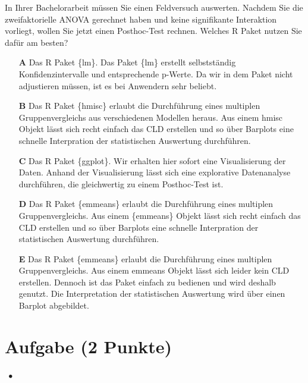 \documentclass[a4paper, 9pt]{scrartcl}\usepackage[]{graphicx}\usepackage[]{xcolor}
\begin{document}
In Ihrer Bachelorarbeit müssen Sie einen Feldversuch auswerten. Nachdem Sie die zweifaktorielle ANOVA gerechnet haben und keine signifikante Interaktion vorliegt, wollen Sie jetzt einen Posthoc-Test rechnen. Welches R Paket nutzen Sie dafür am besten?



\begin{enumerate}
\item [\textbf{A} \msquare] Das R Paket \{lm\}. Das Paket \{lm\} erstellt selbstständig Konfidenzintervalle und entsprechende p-Werte. Da wir in dem Paket nicht adjustieren müssen, ist es bei Anwendern sehr beliebt.
\item [\textbf{B} \msquare] Das R Paket \{hmisc\} erlaubt die Durchführung eines multiplen Gruppenvergleichs aus verschiedenen Modellen heraus. Aus einem hmisc Objekt lässt sich recht einfach das CLD erstellen und so über Barplots eine schnelle Interpration der statistischen Auswertung durchführen.
\item [\textbf{C} \msquare] Das R Paket \{ggplot\}. Wir erhalten hier sofort eine Visualisierung der Daten. Anhand der Visualisierung lässt sich eine explorative Datenanalyse durchführen, die gleichwertig zu einem Posthoc-Test ist.
\item [\textbf{D} \msquare] Das R Paket \{emmeans\} erlaubt die Durchführung eines multiplen Gruppenvergleichs. Aus einem \{emmeans\} Objekt lässt sich recht einfach das CLD erstellen und so über Barplots eine schnelle Interpration der statistischen Auswertung durchführen.
\item [\textbf{E} \msquare] Das R Paket \{emmeans\} erlaubt die Durchführung eines multiplen Gruppenvergleichs. Aus einem emmeans Objekt lässt sich leider kein CLD erstellen. Dennoch ist das Paket einfach zu bedienen und wird deshalb genutzt. Die Interpretation der statistischen Auswertung wird über einen Barplot abgebildet.
\end{enumerate}

\section{Aufgabe \hfill (2 Punkte)}

\ifcollection
\begin{flushright}
\tiny\vspace{-2Ex}
\textbf{\examinhaltstart}
\exammodulestatversuch $\;\bullet$
\exammodulebiostat
\vspace{-1Ex}
\end{flushright}
\fi
\end{document}
